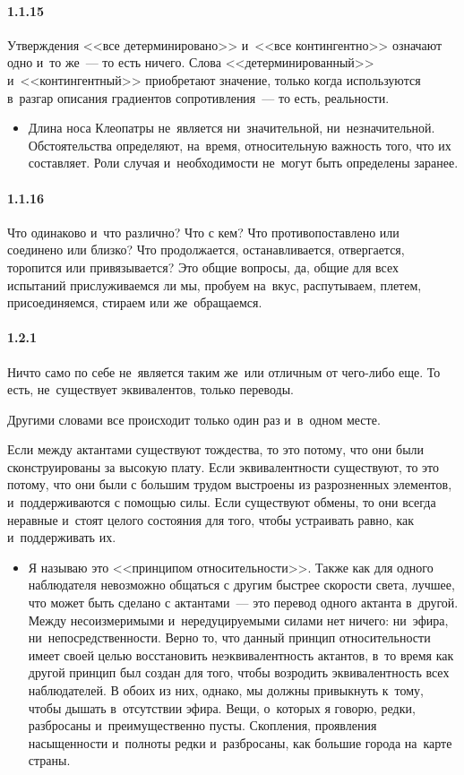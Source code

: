 \paragraph{1.1.15}\hypertarget{par:1.1.15}{} Утверждения <<все детерминировано>> и~<<все контингентно>> означают одно и~то же~--- то есть ничего. Слова <<детерминированный>> и~<<контингентный>> приобретают
значение, только когда используются в~разгар описания градиентов сопротивления~--- то есть, реальности.
	\begin{itemize}
	\item Длина носа Клеопатры не~является ни~значительной, ни~незначительной. Обстоятельства определяют, на~время, относительную важность того, что их составляет. Роли случая и~необходимости не~могут быть определены заранее.

	\end{itemize}

\paragraph{1.1.16}\hypertarget{par:1.1.16}{} Что одинаково и~что различно? Что с кем? Что противопоставлено или соединено или близко? Что продолжается, останавливается, отвергается, торопится или привязывается? Это общие вопросы, да, общие для всех испытаний прислуживаемся ли мы, пробуем на~вкус, распутываем, плетем, присоединяемся, стираем или же~обращаемся.

\paragraph{1.2.1}\hypertarget{par:1.2.1}{} Ничто само по себе не~является таким же~или отличным от чего-либо еще. То есть, не~существует эквивалентов, только переводы.

Другими словами все происходит только один раз и~в~одном месте.

Если между актантами существуют тождества, то это потому, что они были сконструированы за высокую плату. Если эквивалентности существуют, то это потому, что они были с большим трудом выстроены из разрозненных элементов, и~поддерживаются с помощью силы. Если существуют обмены, то они всегда неравные и~стоят целого состояния для того, чтобы устраивать равно, как и~поддерживать их.
	\begin{itemize}
	\item Я называю это <<принципом относительности>>. Также как для одного наблюдателя невозможно общаться с другим быстрее скорости света, лучшее, что может быть сделано с актантами~--- это перевод одного актанта в~другой. Между несоизмеримыми и~нередуцируемыми силами нет ничего: ни~эфира, ни~непосредственности. Верно то, что данный принцип относительности имеет своей целью восстановить неэквивалентность актантов, в~то время как другой принцип был создан для того, чтобы возродить эквивалентность всех наблюдателей. В обоих из них, однако, мы должны привыкнуть к~тому, чтобы дышать в~отсутствии эфира. Вещи, о~которых я говорю, редки, разбросаны и~преимущественно пусты. Скопления, проявления насыщенности и~полноты редки и~разбросаны, как большие города на~карте страны.

	\end{itemize}

